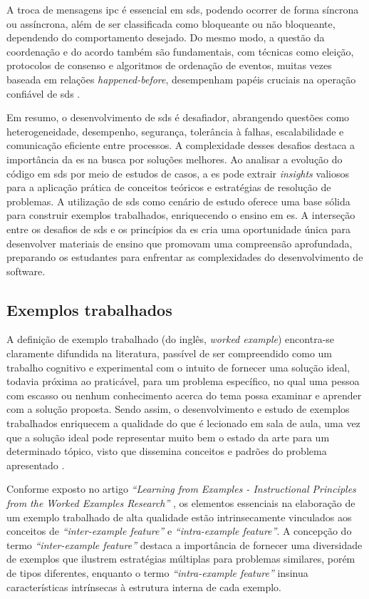 A troca de mensagens \gls{ipc} é essencial em \gls{sds}, podendo ocorrer de forma síncrona ou assíncrona, além de ser classificada como bloqueante ou não bloqueante, dependendo do comportamento desejado. Do mesmo modo, a questão da coordenação e do acordo também são fundamentais, com técnicas como eleição, protocolos de consenso e algoritmos de ordenação de eventos, muitas vezes baseada em relações \textit{happened-before}, desempenham papéis cruciais na operação confiável de \gls{sds} \cite{DistributedSystemsCoulouris}.

Em resumo, o desenvolvimento de \gls{sds} é desafiador, abrangendo questões como heterogeneidade, desempenho, segurança, tolerância à falhas, escalabilidade e comunicação eficiente entre processos. A complexidade desses desafios destaca a importância da \gls{es} na busca por soluções melhores. Ao analisar a evolução do código em \gls{sds} por meio de estudos de casos, a \gls{es} pode extrair \textit{insights} valiosos para a aplicação prática de conceitos teóricos e estratégias de resolução de problemas. A utilização de \gls{sds} como cenário de estudo oferece uma base sólida para construir exemplos trabalhados, enriquecendo o ensino em \gls{es}. A interseção entre os desafios de \gls{sds} e os princípios da \gls{es} cria uma oportunidade única para desenvolver materiais de ensino que promovam uma compreensão aprofundada, preparando os estudantes para enfrentar as complexidades do desenvolvimento de software.

\subsection{Exemplos trabalhados}

A definição de exemplo trabalhado (do inglês, \textit{worked example}) encontra-se claramente difundida na literatura, passível de ser compreendido como um trabalho cognitivo e experimental com o intuito de fornecer uma solução ideal, todavia próxima ao praticável, para um problema específico, no qual uma pessoa com escasso ou nenhum conhecimento acerca do tema possa examinar e aprender com a solução proposta. Sendo assim, o desenvolvimento e estudo de exemplos trabalhados enriquecem a qualidade do que é lecionado em sala de aula, uma vez que a solução ideal pode representar muito bem o estado da arte para um determinado tópico, visto que dissemina conceitos e padrões do problema apresentado \cite{Robert.Atkinson-etal:2000}.

Conforme exposto no artigo \textit{``Learning from Examples - Instructional Principles from the Worked Examples Research''} \cite{Robert.Atkinson-etal:2000}, os elementos essenciais na elaboração de um exemplo trabalhado de alta qualidade estão intrinsecamente vinculados aos conceitos de \textit{``inter-example feature''} e \textit{``intra-example feature''}. A concepção do termo \textit{``inter-example feature''} destaca a importância de fornecer uma diversidade de exemplos que ilustrem estratégias múltiplas para problemas similares, porém de tipos diferentes, enquanto o termo \textit{``intra-example feature''} insinua características intrínsecas à estrutura interna de cada exemplo. 

